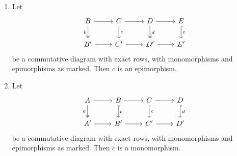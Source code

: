 \documentclass[main.tex]{subfiles}
\begin{document}
\begin{lemma}
  \label{lemma:four_lemmas}
  \leavevmode
  \begin{enumerate}
    \item Let
      \begin{equation*}
        \begin{tikzcd}
          B
          \arrow[r]
          \arrow[d, two heads, swap, "b"]
          & C
          \arrow[r]
          \arrow[d, "c"]
          & D
          \arrow[r]
          \arrow[d, two heads, "d"]
          & E
          \arrow[d, hook, "e"]
          \\
          B'
          \arrow[r]
          & C'
          \arrow[r]
          & D'
          \arrow[r]
          & E'
        \end{tikzcd}
      \end{equation*}
      be a commutative diagram with exact rows, with monomorphisms and epimorphisms as marked. Then $c$ is an epimorphism.

    \item Let
      \begin{equation*}
        \begin{tikzcd}
          A
          \arrow[r]
          \arrow[d, two heads, swap, "a"]
          & B
          \arrow[r]
          \arrow[d, hook, "b"]
          & C
          \arrow[r]
          \arrow[d, "c"]
          & D
          \arrow[d, hook, "d"]
          \\
          A'
          \arrow[r]
          & B'
          \arrow[r]
          & C'
          \arrow[r]
          & D'
        \end{tikzcd}
      \end{equation*}
      be a commutative diagram with exact rows, with monomorphisms and epimorphisms as marked. Then $c$ is a monomorphism.
  \end{enumerate}
\end{lemma}
\end{document}
